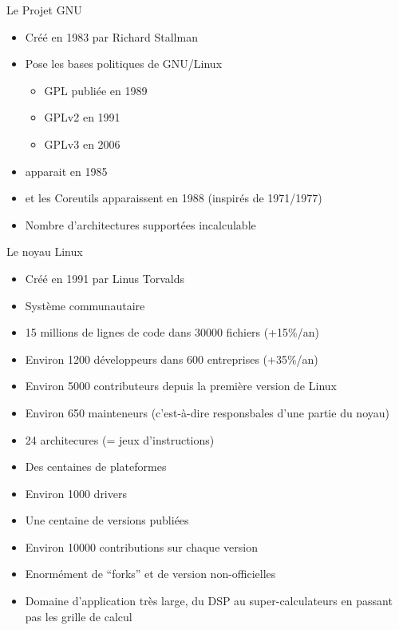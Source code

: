 \begin{frame}{Le Projet GNU}
  \begin{itemize}
  \item Créé en 1983 par Richard Stallman
  \item Pose  les bases politiques  de GNU/Linux
    \begin{itemize}
    \item GPL publiée en 1989
    \item GPLv2 en 1991 
    \item GPLv3 en 2006
    \end{itemize}
  \item {} apparait en 1985
  \item {} et les  Coreutils apparaissent en 1988 (inspirés de
     1971/1977)
  \item Nombre d'architectures supportées incalculable
  \end{itemize}
\end{frame}

\begin{frame}{Le noyau Linux}
  \begin{itemize}
  \item Créé  en 1991 par  Linus Torvalds 
  \item Système communautaire 
  \item 15 millions de lignes de code dans 30000 fichiers (+15\%/an)
  \item Environ 1200 développeurs dans 600 entreprises (+35\%/an)
  \item Environ 5000 contributeurs depuis la première version de Linux
  \item  Environ  650  mainteneurs  (c'est-à-dire  responsbales  d'une
    partie du noyau)
  \item 24 architecures (= jeux d'instructions)
  \item Des centaines de plateformes
  \item Environ 1000 drivers
  \item Une centaine de versions publiées
  \item Environ 10000 contributions sur chaque version
  \item Enormément de ``forks'' et de version non-officielles
  \item Domaine d'application très large, du DSP au super-calculateurs
    en passant pas les grille de calcul
  \end{itemize}
\end{frame}

